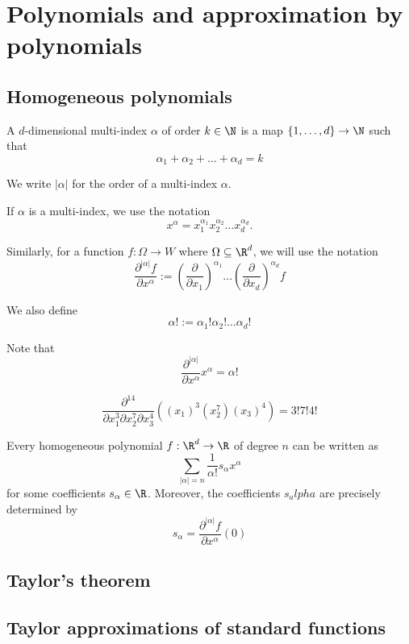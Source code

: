 \section{Polynomials and approximation by polynomials}

\subsection{Homogeneous polynomials}
\begin{definition}
    A $d$-dimensional multi-index $\alpha$ of order $k \in \N$ is a map
    $\{1,\dots,d\} \to \N$ such that
    $$\alpha_1 + \alpha_2 + \dots + \alpha_d = k$$

    We write $|\alpha|$ for the order of a multi-index $\alpha$.
\end{definition}

If $\alpha$ is a multi-index, we use the notation
$$x^\alpha = x_1^{\alpha_1}x_2^{\alpha_2}\dots x_d^{\alpha_d}.$$

Similarly, for a function $f: \Omega \to W$ where $\Omega \subseteq \R^d$, we will use the notation
$$\frac{\partial^{|\alpha|}f}{\partial x^\alpha}:=\left(\frac{\partial}{\partial x_1}\right)^{\alpha_1}\dots\left(\frac{\partial}{\partial x_d}\right)^{\alpha_d}f$$

We also define
$$\alpha!:=\alpha_1!\alpha_2!\dots\alpha_d!$$

Note that 
$$\frac{\partial^{|\alpha|}}{\partial x^\alpha}x^\alpha = \alpha!$$

\begin{example}
    $$\frac{\partial^{14}}{\partial x_1^3\partial x_2^7\partial x_3^4}((x_1)^3(x_2^7)(x_3)^4) = 3!7!4!$$
\end{example}

\begin{proposition}
    Every homogeneous polynomial $f: \R^d \to \R$ of degree $n$ can be written as
    $$\sum_{|\alpha|=n}\frac{1}{\alpha!}s_\alpha x^\alpha$$
    for some coefficients $s_\alpha \in \R$. Moreover, the coefficients $s_alpha$ are precisely determined by
    $$s_\alpha = \frac{\partial^{|\alpha|}f}{\partial x^\alpha}(0)$$
\end{proposition}


\subsection{Taylor's theorem}

\subsection{Taylor approximations of standard functions}
